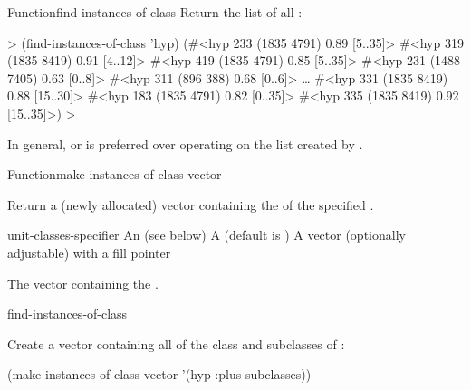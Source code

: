 \documentclass[10pt,twoside,english,pdftex]{article}
\begin{document}
\begin{functiondoc}{Function}{find-instances-of-class}
\fnexample
Return the list of all  :
%
\W\supp
\begin{example}
  > (find-instances-of-class 'hyp)
  (#<hyp 233 (1835 4791) 0.89 [5..35]>
   #<hyp 319 (1835 8419) 0.91 [4..12]>
   #<hyp 419 (1835 4791) 0.85 [5..35]>
   #<hyp 231 (1488 7405) 0.63 [0..8]>
   #<hyp 311 (896 388) 0.68 [0..6]> 
     \textrm{\ldots{}}
   #<hyp 331 (1835 8419) 0.88 [15..30]>
   #<hyp 183 (1835 4791) 0.82 [0..35]>
   #<hyp 335 (1835 8419) 0.92 [15..35]>)
  >
\end{example} 

\fnnote In general,  or
 is preferred over operating
on the list created by .

\end{functiondoc}


\begin{functiondoc}{Function}{make-instances-of-class-vector}%
  {
      
    \returns{} }

%
%

\fnsyntax

\fnpurpose Return a (newly allocated) vector containing the
 of the specified .

\fnpackage {}

\fnmodule {}

\fnargs
\begin{args}{unit-classes-specifier}
 An 
(see below)
\arg[adjustable] A  (default is \nil)
\arg[vector] A vector (optionally adjustable) with a fill pointer
\end{args}

\fnreturns The vector containing the .

\fndsyntax
\W\supp\tabletop
\unitclassesspec
\subclassingspec

\begin{alsos}{find-instances-of-class}
\end{alsos}

\fnexample
Create a vector containing all  of the class 
and subclasses of :
%
\W\supp
\begin{example}
  (make-instances-of-class-vector '(hyp :plus-subclasses))
\end{example} 

\end{functiondoc}
\end{document}
